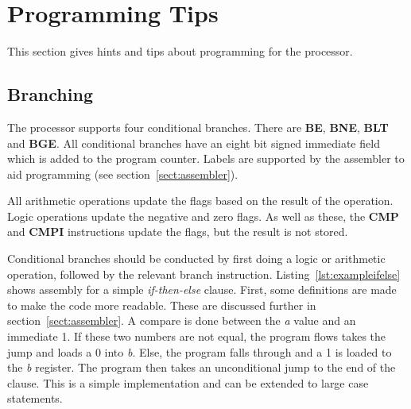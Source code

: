 
\section{Programming Tips}



This section gives hints and tips about programming for the \samurai{} processor. 

\subsection{Branching}

The \samurai{} processor supports four conditional branches. %
There are \textbf{BE}, \textbf{BNE}, \textbf{BLT} and \textbf{BGE}.
All conditional branches have an eight bit signed immediate field which is added to the program counter.
Labels are supported by the assembler to aid programming (see section~\ref{sect:assembler}).

All arithmetic operations update the flags based on the result of the operation. 
Logic operations update the negative and zero flags. 
As well as these, the \textbf{CMP} and \textbf{CMPI} instructions update the flags, but the result is not stored. 

Conditional branches should be conducted by first doing a logic or arithmetic operation, followed by the relevant branch instruction. 
Listing~\ref{lst:exampleifelse} shows assembly for a simple \textit{if-then-else} clause. 
First, some definitions are made to make the code more readable. 
These are discussed further in section~\ref{sect:assembler}.
A compare is done between the \textit{a} value and an immediate 1. 
If these two numbers are not equal, the program flows takes the jump and loads a 0 into \textit{b}.
Else, the program falls through and a 1 is loaded to the \textit{b} register. 
The program then takes an unconditional jump to the end of the clause. 
This is a simple implementation and can be extended to large case statements.

